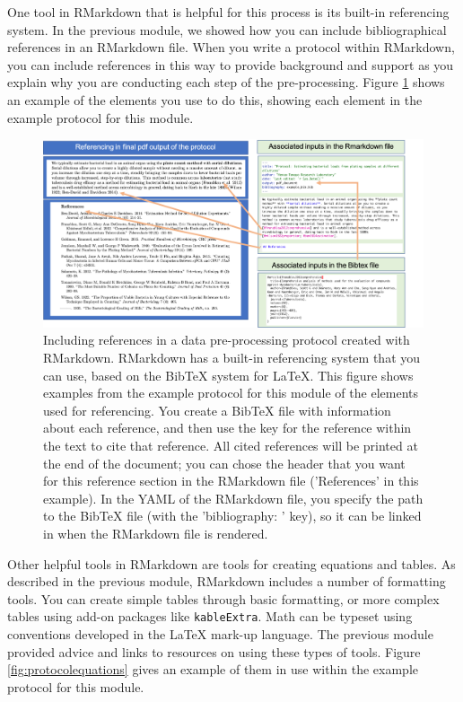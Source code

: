 \documentclass[]{tufte-book}
\begin{document}
One tool in RMarkdown that is helpful for this process is its built-in
referencing system. In the previous module, we showed how you can include
bibliographical references in an RMarkdown file. When you write a protocol
within RMarkdown, you can include references in this way to provide background
and support as you explain why you are conducting each step of the
pre-processing. Figure \ref{fig:protocolreferences} shows an example of the
elements you use to do this, showing each element in the example protocol for
this module.

\begin{figure}
\includegraphics[width=\textwidth]{figures/protocol_references} \caption[Including references in a data pre-processing protocol created with RMarkdown]{Including references in a data pre-processing protocol created with RMarkdown. RMarkdown has a built-in referencing system that you can use, based on the BibTeX system for LaTeX. This figure shows examples from the example protocol for this module of the elements used for referencing. You create a BibTeX file with information about each reference, and then use the key for the reference within the text to cite that reference. All cited references will be printed at the end of the document; you can chose the header that you want for this reference section in the RMarkdown file ('References' in this example). In the YAML of the RMarkdown file, you specify the path to the BibTeX file (with the 'bibliography: ' key), so it can be linked in when the RMarkdown file is rendered.}\label{fig:protocolreferences}
\end{figure}

Other helpful tools in RMarkdown are tools for creating equations and tables. As
described in the previous module, RMarkdown includes a number of formatting
tools. You can create simple tables through basic formatting, or more complex
tables using add-on packages like \texttt{kableExtra}. Math can be typeset using
conventions developed in the LaTeX mark-up language. The previous module
provided advice and links to resources on using these types of tools. Figure
\ref{fig:protocolequations} gives an example of them in use within the example
protocol for this module.
\end{document}
